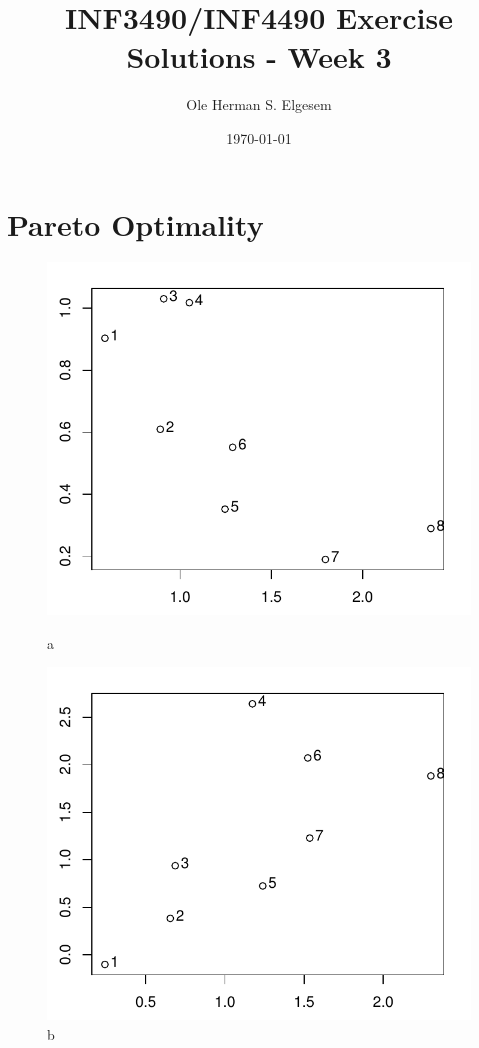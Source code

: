 \documentclass{article}           %
\title{\vspace{-2cm}INF3490/INF4490 Exercise Solutions - Week 3}
\author{Ole Herman S. Elgesem}
\date{\today}
\newcommand\marginsymbol[1][0pt]{%
  \tabto*{0cm}\makebox[\dimexpr-1cm-#1\relax][r]{$\mathbb{P}$}\tabto*{\TabPrevPos}}
\begin{document}
    \renewcommand\marginsymbol[1][0pt]{%
  \tabto*{0cm}\makebox[-1cm][c]{$\mathbb{P}$}\tabto*{\TabPrevPos}}

\maketitle


\section{Pareto Optimality}
\begin{figure}[H]
  \centering
  \begin{minipage}[b]{0.45\textwidth}
    \includegraphics[width=\textwidth]{front_points_1.pdf}
    \caption{a}
  \end{minipage}
  \hfill
  \begin{minipage}[b]{0.45\textwidth}
    \includegraphics[width=\textwidth]{front_points_2.pdf}
    \caption{b}
  \end{minipage}
\end{figure}
\end{document}
